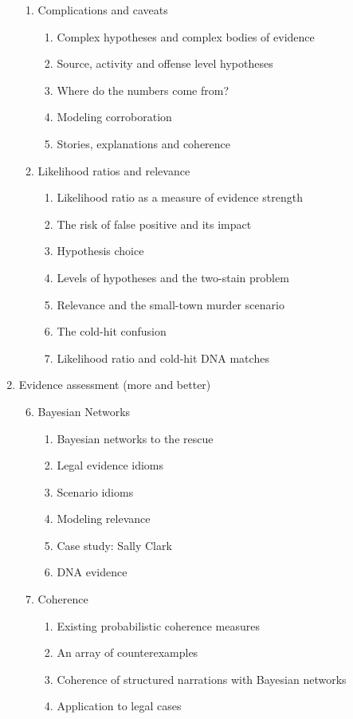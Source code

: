 \documentclass[
  10pt,
  dvipsnames,enabledeprecatedfontcommands]{scrartcl}
\begin{document}
\begin{enumerate}
\begin{enumerate}
  
  
  \item  Complications and caveats
  \begin{enumerate}
  \item  Complex hypotheses and complex bodies of evidence
  \item Source, activity and offense level hypotheses
  \item  Where do the numbers come from?
  \item  Modeling corroboration
  \item  Stories, explanations and coherence
  \end{enumerate}

  
  \item  Likelihood ratios and relevance
  \begin{enumerate}
  \item Likelihood ratio as a measure of evidence strength
  \item The risk of false positive and its impact
  \item Hypothesis choice
  \item Levels of hypotheses and the two-stain problem
  \item Relevance and the small-town murder scenario
  \item The cold-hit confusion
  \item  Likelihood ratio and  cold-hit DNA matches
  \end{enumerate}


\end{enumerate}
\item  Evidence assessment (more and better)
\begin{enumerate}

\setcounter{enumii}{5}
\item  Bayesian Networks

  \begin{enumerate}
  \item  Bayesian networks to the rescue
  \item  Legal evidence idioms
  \item Scenario idioms
  \item Modeling relevance
  \item  Case study: Sally Clark
  \item DNA evidence
  \end{enumerate}
  
   \item Coherence
  \begin{enumerate}
  \item  Existing probabilistic coherence measures
  \item  An array of counterexamples
  \item Coherence of structured narrations with Bayesian networks
  \item  Application to legal cases
  \end{enumerate}
  

\end{enumerate}
\end{enumerate}
\end{document}
